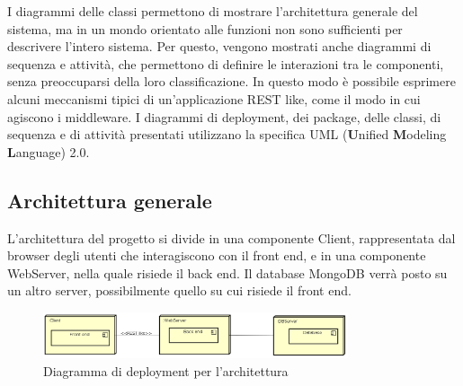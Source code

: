 I diagrammi delle classi permettono di mostrare l'architettura generale del sistema, ma in un mondo orientato alle funzioni non sono sufficienti per descrivere l'intero sistema. Per questo, vengono mostrati anche diagrammi di sequenza e attività, che permettono di definire le interazioni tra le componenti, senza preoccuparsi della loro classificazione. In questo modo è possibile esprimere alcuni meccanismi tipici di un'applicazione REST like, come il modo in cui agiscono i middleware. 
I diagrammi di deployment, dei package, delle classi, di sequenza e di attività presentati utilizzano la specifica UML (\textbf{U}nified \textbf{M}odeling \textbf{L}anguage) 2.0.
\subsection{Architettura generale}
L'architettura del progetto si divide in una componente Client, rappresentata dal browser degli utenti che interagiscono con il front end, e in una componente WebServer, nella quale risiede il back end. Il database MongoDB verrà posto su un altro server, possibilmente quello su cui risiede il front end. \\
\begin{figure}[h]
\centering
\includegraphics[width=0.8\textwidth]{res/sections/GeneralArchitecture.png}
\caption{Diagramma di deployment per l'architettura}
\end{figure}

